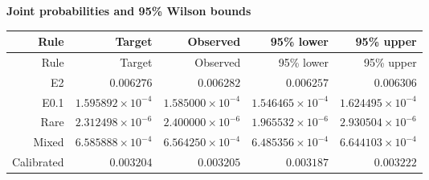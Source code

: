 
\begingroup\small
\setlength{\tabcolsep}{4pt}
\noindent\textbf{Joint probabilities and 95\% Wilson bounds}
\begin{longtable}{rrrrr}
\toprule
Rule & Target & Observed & 95\% lower & 95\% upper \\
\midrule
\endfirsthead
Rule & Target & Observed & 95\% lower & 95\% upper \\
\midrule
\endhead
\bottomrule
\endfoot
E2 & $0.006276$ & $0.006282$ & $0.006257$ & $0.006306$ \\
E0.1 & $1.595892\times10^{-4}$ & $1.585000\times10^{-4}$ & $1.546465\times10^{-4}$ & $1.624495\times10^{-4}$ \\
Rare & $2.312498\times10^{-6}$ & $2.400000\times10^{-6}$ & $1.965532\times10^{-6}$ & $2.930504\times10^{-6}$ \\
Mixed & $6.585888\times10^{-4}$ & $6.564250\times10^{-4}$ & $6.485356\times10^{-4}$ & $6.644103\times10^{-4}$ \\
Calibrated & $0.003204$ & $0.003205$ & $0.003187$ & $0.003222$ \\
\end{longtable}
\endgroup
